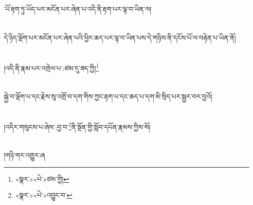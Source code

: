 ་པོ་རྟག་ཏུ་ཡོད་པར་མངོན་པར་ཞེན་པ་འདི་ནི་རྟག་པར་ལྟ་བ་ཡིན་ལ།\chapter{ }དེ་ཉིད་ལྡོག་པར་མངོན་པར་ཞེན་པའི་ཕྱིར་ཆད་པར་ལྟ་བ་ཡིན་པས་དེ་གཉིས་ནི་དངོས་པོ་ལ་བརྟེན་པ་ཡིན་ནོ།\chapter{ }།འདི་ནི་རྣམ་པར་འགྲེལ་པ་:ཙམ་དུ་ཟད་ཀྱི།\footnote{«སྣར་»«པེ་»ཙམ་གྱི།}\chapter{ }སྐྱེ་བ་ལྡོག་པ་དང་རྗེས་སུ་འགྲོ་བ་དག་གིས་ཀྱང་རྟག་པ་དང་ཆད་པ་དག་མི་སྲིད་པར་སྦྱར་བར་བྱའོ།\chapter{ }།འདིར་གསུངས་པ་ཞེས་:བྱ་བ་\footnote{«སྣར་»«པེ་»འབྱུང་བ་}ནི་སྔོན་གྱི་སློབ་དཔོན་རྣམས་ཀྱིས་སོ།\chapter{ }།གཉི་གར་འགྱུར་ཞ